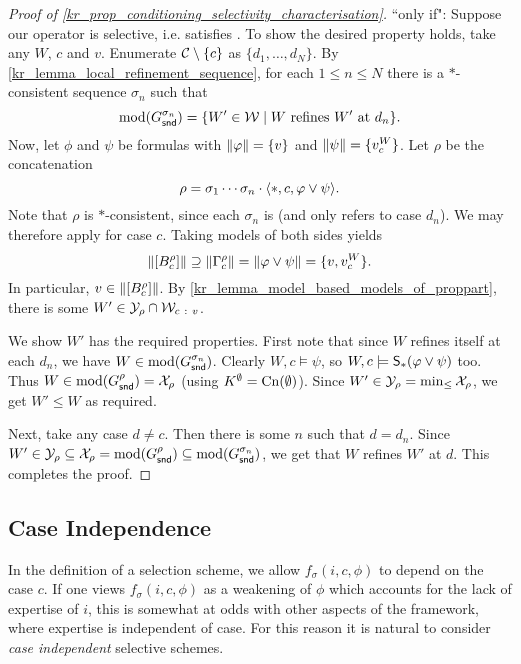 \begin{proof}[Proof of \cref{kr_prop_conditioning_selectivity_characterisation}]
    ``only if": Suppose our operator is selective, i.e. satisfies
    \boundedness{}. To show the desired property holds, take any $W$, $c$ and
    $v$. Enumerate $\C \setminus \{c\}$ as $\{d_1, \ldots, d_N\}$. By
    \cref{kr_lemma_local_refinement_sequence}, for each $1 \le n \le N$ there is a
    $\ast$-consistent sequence $\sigma_n$ such that
    \[
        \mods(G^{\sigma_n}_\snd)
        =
        \{W' \in \W \mid W \text{ refines } W' \text{ at } d_n\}.
    \]
    Now, let $\phi$ and $\psi$ be formulas with $\propmods{\phi} = \{v\}$ and
    $\propmods{\psi} = \{v^W_c\}$. Let $\rho$ be the concatenation
    \[
        \rho
        =
        \sigma_1 \cdots \sigma_n \concat
        \tuple{\ast, c, \phi \lor \psi}.
    \]
    Note that $\rho$ is $\ast$-consistent, since each $\sigma_n$ is (and only
    refers to case $d_n$). We may therefore apply \boundedness{} for case $c$.
    Taking models of both sides yields
    \[
        \propmods{\proppart{B^\rho_c}}
        \supseteq \propmods{\Gamma^\rho_c}
        = \propmods{\phi \lor \psi}
        = \{v, v^W_c\}.
    \]
    In particular, $v \in \propmods{\proppart{B^\rho_c}}$. By
    \cref{kr_lemma_model_based_models_of_proppart}, there is some $W' \in \Y_\rho
    \cap \W_{c\ :\ v}$.

    We show $W'$ has the required properties. First note that since $W$ refines
    itself at each $d_n$, we have $W \in \mods(G^{\sigma_n}_\snd)$. Clearly $W,
    c \models \psi$, so $W, c \models \S_\ast(\phi \lor \psi)$ too. Thus $W \in
    \mods(G^\rho_\snd) = \X_\rho$ (using $K^\emptyset = \cn(\emptyset)$). Since
    $W' \in \Y_\rho = \min_{\le}{\X_\rho}$, we get $W' \le W$ as required.

    Next, take any case $d \ne c$. Then there is some $n$ such that $d = d_n$.
    Since $W' \in \Y_\rho \subseteq \X_\rho = \mods(G^\rho_\snd) \subseteq
    \mods(G^{\sigma_n}_\snd)$, we get that $W$ refines $W'$ at $d$. This
    completes the proof.

\end{proof}


\subsection{Case Independence}

In the definition of a selection scheme, we allow $f_\sigma(i, c, \phi)$ to
depend on the case $c$. If one views $f_\sigma(i, c, \phi)$ as a weakening of
$\phi$ which accounts for the lack of expertise of $i$, this is somewhat at
odds with other aspects of the framework, where expertise is independent of
case. For this reason it is natural to consider \emph{case independent}
selective schemes.


